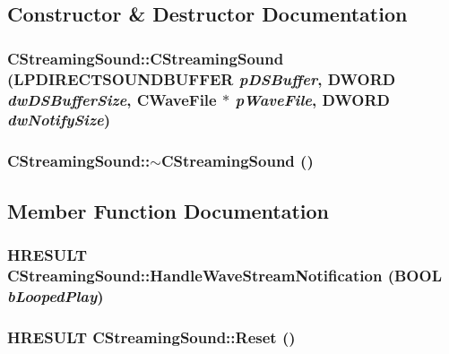 \subsection{Constructor \& Destructor Documentation}
\hypertarget{class_c_streaming_sound_a7fa3961eff8e78fdb5dd8c6740f472df}{
\subsubsection[{CStreamingSound}]{\setlength{\rightskip}{0pt plus 5cm}CStreamingSound::CStreamingSound (LPDIRECTSOUNDBUFFER {\em pDSBuffer}, \/  DWORD {\em dwDSBufferSize}, \/  {\bf CWaveFile} $\ast$ {\em pWaveFile}, \/  DWORD {\em dwNotifySize})}}
\label{class_c_streaming_sound_a7fa3961eff8e78fdb5dd8c6740f472df}
\hypertarget{class_c_streaming_sound_a47348b6fc069a98edf2a9e86bcf6b348}{
\subsubsection[{$\sim$CStreamingSound}]{\setlength{\rightskip}{0pt plus 5cm}CStreamingSound::$\sim$CStreamingSound ()}}
\label{class_c_streaming_sound_a47348b6fc069a98edf2a9e86bcf6b348}


\subsection{Member Function Documentation}
\hypertarget{class_c_streaming_sound_a86f319f40957fb309f9e5eda99186a75}{
\subsubsection[{HandleWaveStreamNotification}]{\setlength{\rightskip}{0pt plus 5cm}HRESULT CStreamingSound::HandleWaveStreamNotification (BOOL {\em bLoopedPlay})}}
\label{class_c_streaming_sound_a86f319f40957fb309f9e5eda99186a75}
\hypertarget{class_c_streaming_sound_a566d5512e22de66e7cfbab17784335cf}{
\subsubsection[{Reset}]{\setlength{\rightskip}{0pt plus 5cm}HRESULT CStreamingSound::Reset ()}}
\label{class_c_streaming_sound_a566d5512e22de66e7cfbab17784335cf}


